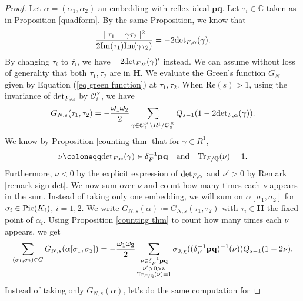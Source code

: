 \documentclass[a4paper,12pt]{article}
\newcommand{\CC}{\mathbb{C}}
\begin{document}
\begin{proof}

Let $\alpha=(\alpha_1,\alpha_2)$ an embedding with reflex ideal $\mathbf{pq}$. Let $\tau_i\in\CC$ taken
as in Proposition \ref{quadform}. By the same Proposition, we know that
\[\frac{\mid \tau_1-\gamma\tau_2\mid^2}{2\text{\normalfont{Im}}(\tau_1)\text{\normalfont{Im}}(\gamma\tau_2)} =-2\textup{det}_{F,\alpha}(\gamma).
\]
By changing $\tau_i$ to $\overline{\tau_i}$, we have $-2\textup{det}_{F,\alpha}(\gamma)'$ instead. We can assume without loss of generality that both $\tau_1,\tau_2$ are in $\mathbf{H}$. We evaluate the Green's function $G_N$ given by Equation (\ref{eq green function}) at $\tau_1,\tau_2$.
 When Re$(s)>1$, using the invariance of $\textup{det}_{F,\alpha}$ by $\mathcal{O}_i^\times$, we have
\begin{equation}
\begin{split}
G_{N,s}(\tau_1,\tau_2)=-\frac{\omega_1\omega_2}{2}\sum_{\gamma\in \mathcal{O}_1^\times\backslash R^1/ \mathcal{O}_2^\times}Q_{s-1}(1-2 \textup{det}_{F,\alpha}(\gamma)).
\end{split}
\end{equation}
We know by Proposition \ref{counting thm} that for $\gamma\in R^1$, 
\begin{equation}
    \nu\coloneqq \textup{det}_{F,\alpha}(\gamma)\in\delta_F^{-1}\mathbf{p}\mathbf{q}\quad\textup{and}\quad \textup{Tr}_{F/\mathbb{Q}}(\nu)=1.
\end{equation}
 Furthermore, $\nu<0$ by the explicit expression of $\textup{det}_{F,\alpha}$ and $\nu'>0$ by Remark \ref{remark sign det}. We now sum over $\nu$ and count how many times each $\nu$ appears in the sum. Instead of taking only one embedding, we will sum on $\alpha[\sigma_1,\sigma_2]$ for 
$\sigma_i\in\textup{Pic}(K_i)$, $i=1,2$. We write $G_{N,s}(\alpha)\coloneqq G_{N,s}(\tau_1,\tau_2)$ with $\tau_i\in\mathbf{H}$ the fixed point of $\alpha_i$. Using Proposition \ref{counting thm} to count how many times each $\nu$ appears, we get
\begin{equation}
\sum_{(\sigma_1,\sigma_2)\in G}G_{N,s}(\alpha[\sigma_1,\sigma_2])
= -\frac{\omega_1\omega_2}{2}\sum_{\substack{\nu\in \delta_F^{-1}\mathbf{p}\mathbf{q}\\ \nu'>0>\nu\\ \textup{Tr}_{F/\mathbb{Q}}(\nu)=1}}\sigma_{0,\chi}((\delta_F^{-1}\mathbf{p}\mathbf{q})^{-1}(\nu))Q_{s-1}(1-2\nu).
\end{equation}
Instead of taking only $G_{N,s}(\alpha)$, let's do the same computation for 

\end{proof}
\end{document}
